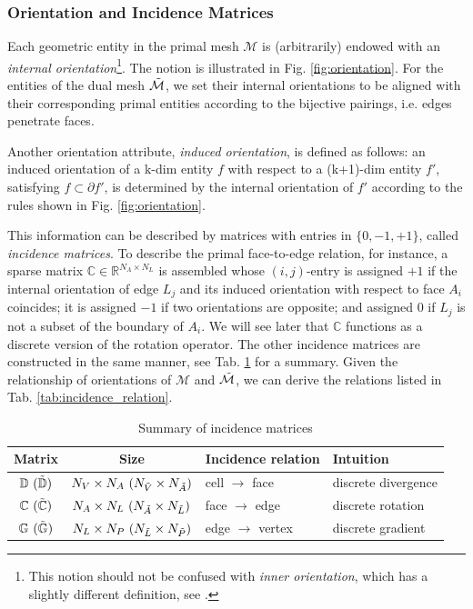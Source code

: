 \documentclass{article}
\begin{document}
\subsubsection{Orientation and Incidence Matrices}

Each geometric entity in the primal mesh $\mathcal{M}$ is (arbitrarily) endowed with an
\emph{internal orientation}\footnote{This notion should not be confused with \emph{inner
    orientation}, which has a slightly different definition, see
  \cite[][Sec. 3.1]{tonti_2002}.}. The notion is illustrated in
Fig. \ref{fig:orientation}. For the entities of the dual mesh $\Tilde{\mathcal{M}}$, we
set their internal orientations to be aligned with their corresponding primal entities
according to the bijective pairings, i.e. edges penetrate faces.

Another orientation attribute, \emph{induced orientation}, is defined as follows: an induced orientation of a k-dim entity $f$ with respect to a (k+1)-dim entity $f'$, satisfying $f \subset \partial f' $, is determined by the internal orientation of $f'$ according to the rules shown in Fig. \ref{fig:orientation}. 

This information can be described by matrices with entries in $\{0,-1,+1\}$, called \emph{incidence matrices}. To describe the primal face-to-edge relation, for instance, a sparse matrix $\mathbb{C} \in \mathbb{R}^{N_A \times N_L}$ is assembled whose $(i,j)$-entry is assigned $+1$ if the internal orientation of edge $L_j$ and its induced orientation with respect to face $A_i$ coincides; it is assigned $-1$ if two orientations are opposite; and assigned $0$ if $L_j$ is not a subset of the boundary of $A_i$. We will see later that $\mathbb{C}$ functions as a discrete version of the rotation operator. The other incidence matrices are constructed in the same manner, see Tab. \ref{tab:incidence_mat} for a summary. Given the relationship of orientations of $\mathcal{M}$ and $\Tilde{\mathcal{M}}$, we can derive the relations listed in Tab. \ref{tab:incidence_relation}.  

\begin{table}[h!]
    \centering
    \begin{tabular}{c c l l}
    \hline
         Matrix & Size & Incidence relation & Intuition  \\
    \hline
         $\mathbb{D}\ (\Tilde{\mathbb{D}})$ & $N_V \times N_A\ (N_{\Tilde{V}} \times N_{\Tilde{A}})$ & cell $\rightarrow$ face & discrete divergence \\
         $\mathbb{C}\ (\Tilde{\mathbb{C}})$ & $N_A \times N_L\ (N_{\Tilde{A}} \times N_{\Tilde{L}})$ & face $\rightarrow$ edge & discrete rotation \\
         $\mathbb{G}\ (\Tilde{\mathbb{G}})$ & $N_L \times N_P\ (N_{\Tilde{L}} \times N_{\Tilde{P}})$ & edge $\rightarrow$ vertex & discrete gradient
         \\
    \hline
    \end{tabular}
    \caption{Summary of incidence matrices}
    \label{tab:incidence_mat}
\end{table}
\end{document}
